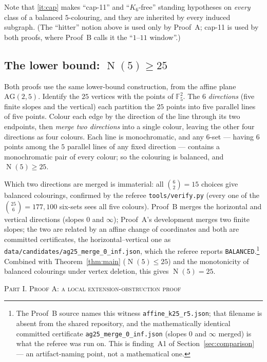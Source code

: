 \documentclass[11pt,reqno]{amsart}
\theoremstyle{definition}
\theoremstyle{remark}
\newcommand{\F}{\mathbb{F}}
\newcommand{\capeleven}{\textsf{cap-11}}
\DeclareMathOperator{\Ncap}{N}
\newcommand{\ppart}[1]{%
  \bigskip\par\begin{center}\normalfont\scshape\large #1\end{center}%
  \nopagebreak\medskip}
\begin{document}
Note that \ref{it:cap} makes ``\capeleven'' and ``$K_6$-free'' standing hypotheses
on \emph{every} class of a balanced $5$-colouring, and they are inherited by every
induced subgraph. (The ``hitter'' notion above is used only by Proof~A; \capeleven{} is
used by both proofs, where Proof~B calls it the ``$1$--$11$ window''.)

\subsection{The lower bound: \texorpdfstring{$\Ncap(5)\ge 25$}{N(5) >= 25}}\label{ssec:lowerbound}
Both proofs use the same lower-bound construction, from the affine plane
$\mathrm{AG}(2,5)$. Identify the $25$ vertices with the points of $\F_5^2$. The $6$
\emph{directions} (five finite slopes and the vertical) each partition the $25$ points
into five parallel lines of five points. Colour each edge by the direction of the line
through its two endpoints, then \emph{merge two directions} into a single colour,
leaving the other four directions as four colours. Each line is monochromatic, and any
$6$-set --- having $6$ points among the $5$ parallel lines of any fixed direction ---
contains a monochromatic pair of every colour; so the colouring is balanced, and
$\Ncap(5)\ge 25$.

Which two directions are merged is immaterial: all $\binom 62=15$ choices give balanced
colourings, confirmed by the referee \texttt{tools/verify.py} (every one of the
$\binom{25}{6}=177{,}100$ six-sets sees all five colours). Proof~B merges the horizontal
and vertical directions (slopes $0$ and $\infty$); Proof~A's development merges two
finite slopes; the two are related by an affine change of coordinates and both are
committed certificates, the horizontal--vertical one as
\texttt{data/candidates/ag25\_merge\_0\_inf.json}, which the referee reports
\texttt{BALANCED}.\footnote{The Proof~B source names this witness
\texttt{affine\_k25\_r5.json}; that filename is absent from the shared repository, and
the mathematically identical committed certificate \texttt{ag25\_merge\_0\_inf.json}
(slopes $0$ and $\infty$ merged) is what the referee was run on. This is finding~A1 of
Section~\ref{sec:comparison} --- an artifact-naming point, not a mathematical one.}
Combined with Theorem~\ref{thm:main} ($\Ncap(5)\le 25$) and the monotonicity of balanced
colourings under vertex deletion, this gives $\Ncap(5)=25$.

\ppart{Part I. Proof A: a local extension-obstruction proof}
\end{document}
